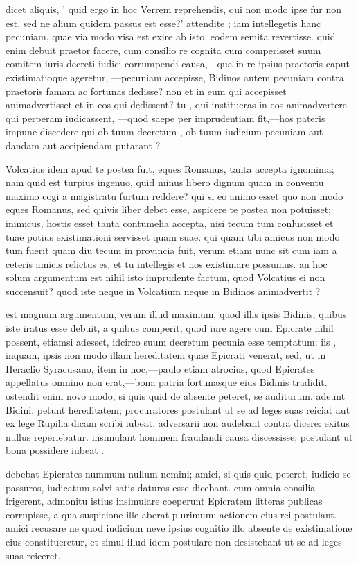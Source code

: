  dicet aliquis, ' quid ergo in hoc Verrem reprehendis, qui non modo ipse fur non est, sed ne alium quidem passus est esse?' attendite ; iam intellegetis hanc pecuniam, quae via modo visa est exire ab isto, eodem semita revertisse. quid enim debuit praetor facere, cum consilio re cognita cum comperisset suum comitem iuris decreti iudici corrumpendi causa,—qua in re ipsius praetoris caput existimatioque ageretur, —pecuniam accepisse, Bidinos autem pecuniam contra praetoris famam ac fortunas dedisse? non et in eum qui accepisset animadvertisset et in eos qui dedissent? tu , qui institueras in eos animadvertere qui perperam iudicassent, —quod saepe per imprudentiam fit,—hos pateris impune discedere qui ob tuum decretum , ob tuum iudicium pecuniam aut dandam aut accipiendam putarant ?

 Volcatius idem apud te postea fuit, eques Romanus, tanta accepta ignominia; nam quid est turpius ingenuo, quid minus libero dignum quam in conventu maximo cogi a magistratu furtum reddere? qui si eo animo esset quo non modo eques Romanus, sed quivis liber debet esse, aspicere te postea non potuisset; inimicus, hostis esset tanta contumelia accepta, nisi tecum tum conlusisset et tuae potius existimationi servisset quam suae. qui quam tibi amicus non modo tum fuerit quam diu tecum in provincia fuit, verum etiam nunc sit cum iam a ceteris amicis relictus es, et tu intellegis et nos existimare possumus. an hoc solum argumentum est nihil isto imprudente factum, quod Volcatius ei non succensuit? quod iste neque in Volcatium neque in Bidinos animadvertit ?

 est magnum argumentum, verum illud maximum, quod illis ipsis Bidinis, quibus iste iratus esse debuit, a quibus comperit, quod iure agere cum Epicrate nihil possent, etiamsi adesset, idcirco suum decretum pecunia esse temptatum: iis , inquam, ipsis non modo illam hereditatem quae Epicrati venerat, sed, ut in Heraclio Syracusano, item in hoc,—paulo etiam atrocius, quod Epicrates appellatus omnino non erat,—bona patria fortunasque eius Bidinis tradidit. ostendit enim novo modo, si quis quid de absente peteret, se auditurum. adeunt Bidini, petunt hereditatem; procuratores postulant ut se ad leges suas reiciat aut ex lege Rupilia dicam scribi iubeat. adversarii non audebant contra dicere: exitus nullus reperiebatur. insimulant hominem fraudandi causa discessisse; postulant ut bona possidere iubeat .

 debebat Epicrates nummum nullum nemini; amici, si quis quid peteret, iudicio se passuros, iudicatum solvi satis daturos esse dicebant. cum omnia consilia frigerent, admonitu istius insimulare coeperunt Epicratem litteras publicas corrupisse, a qua suspicione ille aberat plurimum: actionem eius rei postulant. amici recusare ne quod iudicium neve ipsius cognitio illo absente de existimatione eius constitueretur, et simul illud idem postulare non desistebant ut se ad leges suas reiceret.

